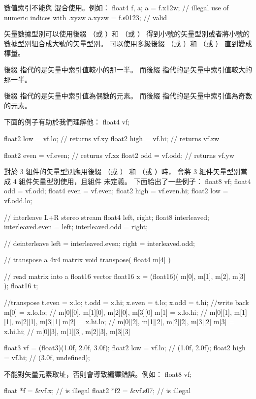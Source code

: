 數值索引不能與  混合使用。例如：
\startclc
float4 f, a;
a = f.x12w;	// illegal use of numeric indices with .xyzw
a.xyzw = f.s0123;	// valid
\stopclc

矢量數據型別可以使用後綴  （或 ）和  （或 ）
得到小號的矢量型別或者將小號的數據型別組合成大號的矢量型別。
可以使用多級後綴  （或 ）和  （或 ）
直到變成標量。

後綴  指代的是矢量中索引值較小的那一半。
而後綴  指代的是矢量中索引值較大的那一半。

後綴  指代的是矢量中索引值為偶數的元素。
而後綴  指代的是矢量中索引值為奇數的元素。

下面的例子有助於我們理解他：
\startclc
float4 vf;

float2 low = vf.lo;	// returns vf.xy
float2 high = vf.hi;	// returns vf.zw

float2 even = vf.even;	// returns vf.xz
float2 odd = vf.odd;	// returns vf.yw
\stopclc

對於 3 組件的矢量型別應用後綴  （或 ）
和  （或 ）時，
會將 3 組件矢量型別當成 4 組件矢量型別使用，且組件  未定義。
下面給出了一些例子：
\startclc
float8	vf;
float4	odd = vf.odd;
float4	even = vf.even;
float2	high = vf.even.hi;
float2	low = vf.odd.lo;

// interleave L+R stereo stream
float4	left, right;
float8	interleaved;
interleaved.even = left;
interleaved.odd = right;

// deinterleave
left = interleaved.even;
right = interleaved.odd;

// transpose a 4x4 matrix
void transpose( float4 m[4] )
{
	// read matrix into a float16 vector
	float16 x = (float16)( m[0], m[1], m[2], m[3] );
	float16 t;

	//transpose
	t.even = x.lo;
	t.odd = x.hi;
	x.even = t.lo;
	x.odd = t.hi;
	//write back
	m[0] = x.lo.lo;	// { m[0][0], m[1][0], m[2][0], m[3][0] }
	m[1] = x.lo.hi;	// { m[0][1], m[1][1], m[2][1], m[3][1] }
	m[2] = x.hi.lo;	// { m[0][2], m[1][2], m[2][2], m[3][2] }
	m[3] = x.hi.hi;	// { m[0][3], m[1][3], m[2][3], m[3][3] }
}

float3	vf = (float3)(1.0f, 2.0f, 3.0f);
float2	low = vf.lo; // (1.0f, 2.0f);
float2	high = vf.hi; // (3.0f, undefined);
\stopclc

不能對矢量元素取址，否則會導致編譯錯誤。例如：
\startclc
float8	vf;

float	*f = &vf.x;		// is illegal
float2	*f2 = &vf.s07;		// is illegal

